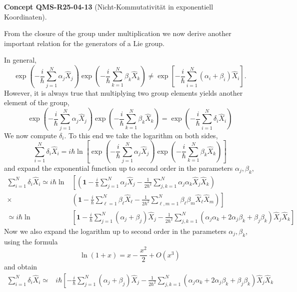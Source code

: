 \documentclass[10pt, letterpaper]{article}
\newcommand{\CustomHeading}[3]{%
  \par\medskip\noindent%
  \textbf{#1 #2} \textnormal{(#3)}.\enskip%
}
\newenvironment{CONC}[2]{\begin{unitbox}\CustomHeading{Concept}{#1}{#2}}{\end{unitbox}}
\begin{document}
\begin{CONC}{QMS-R25-04-13}{Nicht-Kommutativität in exponentiell Koordinaten}
From the closure of the group under multiplication we now derive another important relation for the generators of a Lie group. 

In general,
$$
\exp \left(-\frac{i}{\hbar} \sum_{j=1}^{N} \alpha_{j} \hat{X}_{j}\right) \exp \left(-\frac{i}{\hbar} \sum_{k=1}^{N} \beta_{k} \hat{X}_{k}\right) \neq \exp \left[-\frac{i}{\hbar} \sum_{i=1}^{N}\left(\alpha_{i}+\beta_{i}\right) \hat{X}_{i}\right] .
$$
However, it is always true that multiplying two group elements yields another element of the group,
$$
\exp \left(-\frac{i}{\hbar} \sum_{j=1}^{N} \alpha_{j} \hat{X}_{j}\right) \exp \left(-\frac{i}{\hbar} \sum_{k=1}^{N} \beta_{k} \hat{X}_{k}\right)=\exp \left(-\frac{i}{\hbar} \sum_{i=1}^{N} \delta_{i} \hat{X}_{i}\right)
$$
We now compute $\delta_{i}$. To this end we take the logarithm on both sides,
$$
\sum_{i=1}^{N} \delta_{i} \hat{X}_{i}=i \hbar \ln \left[\exp \left(-\frac{i}{\hbar} \sum_{j=1}^{N} \alpha_{j} \hat{X}_{j}\right) \exp \left(-\frac{i}{\hbar} \sum_{k=1}^{N} \beta_{k} \hat{X}_{k}\right)\right]
$$
and expand the exponential function up to second order in the parameters $\alpha_{j}, \beta_{k}$,
$$
\begin{aligned}
\sum_{i=1}^{N} \delta_{i} \hat{X}_{i} \simeq i \hbar \ln & {\left[\left(\mathbf{1}-\frac{i}{\hbar} \sum_{j=1}^{N} \alpha_{j} \hat{X}_{j}-\frac{1}{2 \hbar^{2}} \sum_{j, k=1}^{N} \alpha_{j} \alpha_{k} \hat{X}_{j} \hat{X}_{k}\right)\right.} \\
\times & \left.\left(\mathbf{1}-\frac{i}{\hbar} \sum_{\ell=1}^{N} \beta_{\ell} \hat{X}_{\ell}-\frac{1}{2 \hbar^{2}} \sum_{\ell, m=1}^{N} \beta_{\ell} \beta_{m} \hat{X}_{\ell} \hat{X}_{m}\right)\right] \\
\simeq i \hbar \ln & {\left[\mathbf{1}-\frac{i}{\hbar} \sum_{j=1}^{N}\left(\alpha_{j}+\beta_{j}\right) \hat{X}_{j}-\frac{1}{2 \hbar^{2}} \sum_{j, k=1}^{N}\left(\alpha_{j} \alpha_{k}+2 \alpha_{j} \beta_{k}+\beta_{j} \beta_{k}\right) \hat{X}_{j} \hat{X}_{k}\right] }
\end{aligned}
$$
Now we also expand the logarithm up to second order in the parameters $\alpha_{j}, \beta_{k}$, using the formula
$$
\ln (1+x)=x-\frac{x^{2}}{2}+O\left(x^{3}\right)
$$
and obtain
$$
\begin{aligned}
\sum_{i=1}^{N} \delta_{i} \hat{X}_{i} \simeq & i \hbar\left[-\frac{i}{\hbar} \sum_{j=1}^{N}\left(\alpha_{j}+\beta_{j}\right) \hat{X}_{j}-\frac{1}{2 \hbar^{2}} \sum_{j, k=1}^{N}\left(\alpha_{j} \alpha_{k}+2 \alpha_{j} \beta_{k}+\beta_{j} \beta_{k}\right) \hat{X}_{j} \hat{X}_{k}\right. \\

\end{aligned}$$
\end{CONC}
\end{document}
